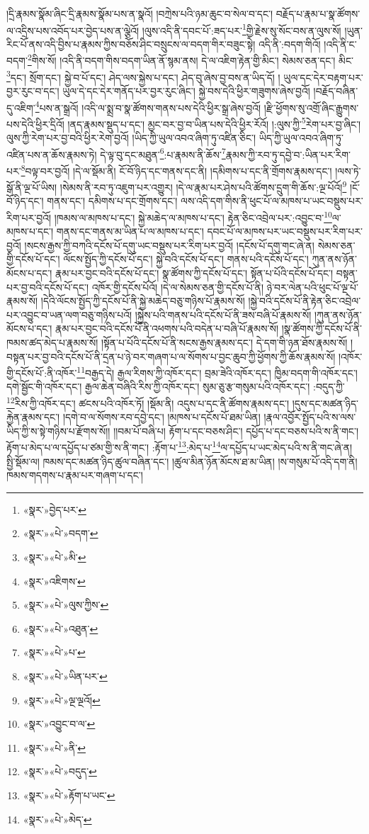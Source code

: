 །དྲི་རྣམས་སྣོམ་ཞིང་དྲི་རྣམས་སྣོམ་པས་ན་སྣའོ། །བཀྲེས་པའི་ཉམ་ཆུང་བ་སེལ་བ་དང་། བརྗོད་པ་རྣམ་པ་སྣ་ཚོགས་ལ་འདྲིས་པས་འབོད་པར་བྱེད་པས་ན་ལྕེའོ། །ལུས་འདི་ནི་དབང་པོ་:ཟད་པར་\footnote{«སྣར་»བྱེད་པར་}གྱི་རྗེས་སུ་སོང་བས་ན་ལུས་སོ། །ཡུན་རིང་པོ་ནས་འདི་བྱིས་པ་རྣམས་ཀྱིས་བཅོས་ཤིང་བསྲུངས་ལ་བདག་གིར་བཟུང་སྟེ། འདི་ནི་:བདག་གིའོ། །འདི་ནི་ང་བདག་\footnote{«སྣར་»«པེ་»བདག་}གིས་སོ། །འདི་ནི་བདག་གིས་བདག་ཡིན་ནོ་སྙམ་ནས། དེ་ལ་འཇིག་རྟེན་གྱི་མིང་། སེམས་ཅན་དང་། མིང་\footnote{«སྣར་»«པེ་»མི་}དང་། སྲོག་དང་། སྐྱེ་བ་པོ་དང་། ཤེད་ལས་སྐྱེས་པ་དང་། ཤེད་བུ་ཞེས་བྱ་བས་ན་ཡིད་དོ། །
ཡུལ་དང་དེར་བརྟག་པར་བྱར་རུང་བ་དང་། ཡུལ་དེ་དང་དེར་གནོད་པར་བྱར་རུང་ཞིང་། སྐྱེ་བས་དེའི་ཕྱིར་གཟུགས་ཞེས་བྱའོ། །བརྗོད་བཞིན་དུ་འཇིག་\footnote{«སྣར་»འཇིགས་}པས་ན་སྒྲའོ། །འདི་ལ་སྨྲ་བ་སྣ་ཚོགས་གནས་པས་དེའི་ཕྱིར་སྒྲ་ཞེས་བྱའོ། །རྫི་ཕྱོགས་སུ་འགྲོ་ཞིང་རྒྱུགས་པས་དེའི་ཕྱིར་དྲིའོ། །ནད་རྣམས་སྡུད་པ་དང་། མྱང་བར་བྱ་བ་ཡིན་པས་དེའི་ཕྱིར་རོའོ། །:ལུས་ཀྱི་\footnote{«སྣར་»«པེ་»ལུས་ཀྱིས་}རེག་པར་བྱ་ཞིང་། ལུས་ཀྱི་རེག་པར་བྱ་བའི་ཕྱིར་རེག་བྱའོ། །ཡིད་ཀྱི་ཡུལ་འབའ་ཞིག་ཏུ་འཛིན་ཅིང་། ཡིད་ཀྱི་ཡུལ་འབའ་ཞིག་ཏུ་འཛིན་པས་ན་ཆོས་རྣམས་ཏེ། དེ་ལྟ་བུ་དང་མཐུན་\footnote{«སྣར་»«པེ་»འཐུན་}:པ་རྣམས་ནི་ཆོས་\footnote{«སྣར་»«པེ་»པ་}རྣམས་ཀྱི་རབ་ཏུ་དབྱེ་བ་:ཡིན་པར་རིག་པར་\footnote{«སྣར་»«པེ་»ཡིན་པར་}བལྟ་བར་བྱའོ། །དེ་ལ་སྡོམ་ནི། ངོ་བོ་ཉིད་དང་གནས་དང་ནི། །དམིགས་པ་དང་ནི་གྲོགས་རྣམས་དང་། །ལས་ཏེ་སྒོ་ནི་ལྔ་པོ་ཡིས། །སེམས་ནི་རབ་ཏུ་འཇུག་པར་འགྱུར། །དེ་ལ་རྣམ་པར་ཤེས་པའི་ཚོགས་དྲུག་གི་ཆོས་:ལྔ་པོའོ།\footnote{«སྣར་»«པེ་»ལྔ་ལྔའོ།} །ངོ་བོ་ཉིད་དང་། གནས་དང་། དམིགས་པ་དང་གྲོགས་དང་། ལས་འདི་དག་གིས་ནི་ཕུང་པོ་ལ་མཁས་པ་ཡང་བསྡུས་པར་རིག་པར་བྱའོ། །ཁམས་ལ་མཁས་པ་དང་། སྐྱེ་མཆེད་ལ་མཁས་པ་དང་། རྟེན་ཅིང་འབྲེལ་པར་:འབྱུང་བ་\footnote{«སྣར་»འབྱུང་བ་ལ་}ལ་མཁས་པ་དང་། གནས་དང་གནས་མ་ཡིན་པ་ལ་མཁས་པ་དང་། དབང་པོ་ལ་མཁས་པར་ཡང་བསྡུས་པར་རིག་པར་བྱའོ། །སངས་རྒྱས་ཀྱི་བཀའི་དངོས་པོ་དགུ་ཡང་བསྡུས་པར་རིག་པར་བྱའོ། །དངོས་པོ་དགུ་གང་ཞེ་ན། སེམས་ཅན་གྱི་དངོས་པོ་དང་། ལོངས་སྤྱོད་ཀྱི་དངོས་པོ་དང་། སྐྱེ་བའི་དངོས་པོ་དང་། གནས་པའི་དངོས་པོ་དང་། ཀུན་ནས་ཉོན་མོངས་པ་དང་། རྣམ་པར་བྱང་བའི་དངོས་པོ་དང་། སྣ་ཚོགས་ཀྱི་དངོས་པོ་དང་། སྟོན་པ་པོའི་དངོས་པོ་དང་། བསྟན་པར་བྱ་བའི་དངོས་པོ་དང་། འཁོར་གྱི་དངོས་པོའོ། །དེ་ལ་སེམས་ཅན་གྱི་དངོས་པོ་ནི། ཉེ་བར་ལེན་པའི་ཕུང་པོ་ལྔ་པོ་རྣམས་སོ། །དེའི་ལོངས་སྤྱོད་ཀྱི་དངོས་པོ་ནི་སྐྱེ་མཆེད་བཅུ་གཉིས་པོ་རྣམས་སོ། །སྐྱེ་བའི་དངོས་པོ་ནི་རྟེན་ཅིང་འབྲེལ་པར་འབྱུང་བ་ཡན་ལག་བཅུ་གཉིས་པའོ། །སྐྱེས་པའི་གནས་པའི་དངོས་པོ་ནི་ཟས་བཞི་པོ་རྣམས་སོ། །ཀུན་ནས་ཉོན་མོངས་པ་དང་། རྣམ་པར་བྱང་བའི་དངོས་པོ་ནི་འཕགས་པའི་བདེན་པ་བཞི་པོ་རྣམས་སོ། །སྣ་ཚོགས་ཀྱི་དངོས་པོ་ནི་ཁམས་ཚད་མེད་པ་རྣམས་སོ། །སྟོན་པ་པོའི་དངོས་པོ་ནི་སངས་རྒྱས་རྣམས་དང་། དེ་དག་གི་ཉན་ཐོས་རྣམས་སོ། །བསྟན་པར་བྱ་བའི་དངོས་པོ་ནི་དྲན་པ་ཉེ་བར་གཞག་པ་ལ་སོགས་པ་བྱང་ཆུབ་ཀྱི་ཕྱོགས་ཀྱི་ཆོས་རྣམས་སོ། །འཁོར་གྱི་དངོས་པོ་:ནི་འཁོར་\footnote{«སྣར་»«པེ་»ནི་}བརྒྱད་དེ། རྒྱལ་རིགས་ཀྱི་འཁོར་དང་། བྲམ་ཟེའི་འཁོར་དང་། ཁྱིམ་བདག་གི་འཁོར་དང་། དགེ་སྦྱོང་གི་འཁོར་དང་། རྒྱལ་ཆེན་བཞིའི་རིས་ཀྱི་འཁོར་དང་། སུམ་ཅུ་རྩ་གསུམ་པའི་འཁོར་དང་། :བདུད་ཀྱི་\footnote{«སྣར་»«པེ་»བདུད་}རིས་ཀྱི་འཁོར་དང་། ཚངས་པའི་འཁོར་ཏོ། །སྡོམ་ནི། འདུས་པ་དང་ནི་ཚོགས་རྣམས་དང་། །དུས་དང་མཚན་ཉིད་རྐྱེན་རྣམས་དང་། །དགེ་བ་ལ་སོགས་རབ་དབྱེ་དང་། །མཁས་པ་དངོས་པོ་ཐམ་ཡིན། །རྣལ་འབྱོར་སྤྱོད་པའི་ས་ལས་ཡིད་ཀྱི་ས་སྟེ་གཉིས་པ་རྫོགས་སོ།། །།བམ་པོ་བཞི་པ། རྟོག་པ་དང་བཅས་ཤིང་། དཔྱོད་པ་དང་བཅས་པའི་ས་ནི་གང་། རྟོག་པ་མེད་པ་ལ་དཔྱོད་པ་ཙམ་གྱི་ས་ནི་གང་། :རྟོག་པ་\footnote{«སྣར་»«པེ་»རྟོག་པ་ཡང་}:མེད་པ་\footnote{«སྣར་»«པེ་»མེད་}ལ་དཔྱོད་པ་ཡང་མེད་པའི་ས་ནི་གང་ཞེ་ན། སྤྱི་སྡོམ་ལ། ཁམས་དང་མཚན་ཉིད་ཚུལ་བཞིན་དང་། །ཚུལ་མིན་ཉོན་མོངས་ཐ་མ་ཡིན། །ས་གསུམ་པོ་འདི་དག་ནི། ཁམས་གདགས་པ་རྣམ་པར་གཞག་པ་དང་། 
